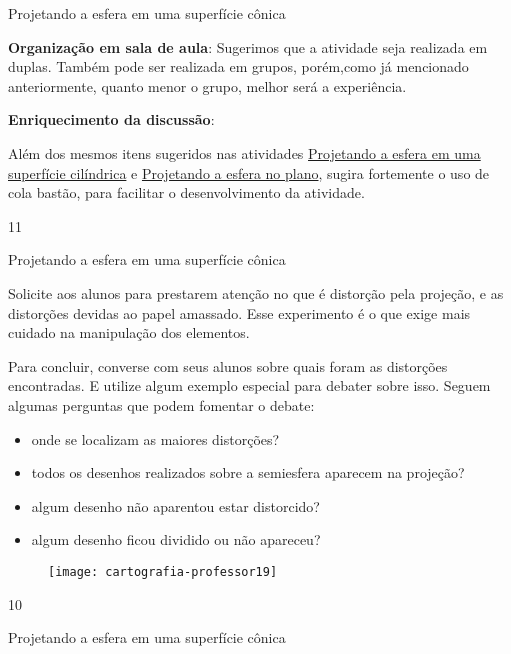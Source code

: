 {\begin{sugestions}{Projetando a esfera em uma superfície cônica}
{  \textbf{Organização em sala de aula}: Sugerimos que a atividade seja realizada em duplas. Também pode ser realizada em grupos, porém,como já mencionado anteriormente, quanto menor o grupo, melhor será a experiência.

  \textbf{Enriquecimento da discussão}:
  
 Além dos mesmos itens sugeridos nas atividades \hyperref[proj_cil]{Projetando a esfera em uma superfície cilíndrica}   e \hyperref[proj-planas]{Projetando a esfera no plano}, sugira fortemente o uso de cola bastão, para facilitar o desenvolvimento da atividade.
}{1}{1}
\end{sugestions}
\clearmargin
\begin{sugestions}{Projetando a esfera em uma superfície cônica}
{


  Solicite aos alunos para prestarem atenção no que é distorção pela projeção, e as distorções devidas ao papel amassado. Esse experimento é o que exige mais cuidado na manipulação dos elementos.

  Para concluir, converse com seus alunos sobre quais foram as distorções encontradas. E  utilize algum exemplo especial para debater sobre isso. Seguem algumas perguntas que podem fomentar o debate:

  \begin{itemize}
  \item onde se localizam as maiores distorções?
  \item todos os desenhos realizados sobre a semiesfera aparecem na projeção?
  \item algum desenho não aparentou estar distorcido?
  \item algum desenho ficou dividido ou não apareceu?
  \end{itemize}

  \begin{figure}[H]
  \centering
  
  \texttt{[image: cartografia-professor19]}
  \end{figure}



}{1}{0}
\end{sugestions}


\label{Pconica}

\begin{task}{Projetando a esfera em uma superfície cônica} \label{proj-conicas}


\end{task}}
